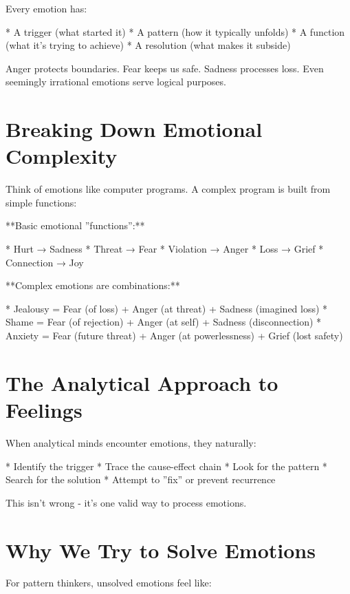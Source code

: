 \documentclass[12pt,oneside]{book}
\begin{document}
Every emotion has:

                    * A trigger (what started it)
                    * A pattern (how it typically unfolds)
                    * A function (what it's trying to achieve)
                    * A resolution (what makes it subside)

Anger protects boundaries. Fear keeps us safe. Sadness processes loss. Even seemingly irrational emotions serve logical purposes.

\section{Breaking Down Emotional Complexity}

Think of emotions like computer programs. A complex program is built from simple functions:

**Basic emotional ''functions'':**

                    * Hurt → Sadness
                    * Threat → Fear
                    * Violation → Anger
                    * Loss → Grief
                    * Connection → Joy

**Complex emotions are combinations:**

                    * Jealousy = Fear (of loss) + Anger (at threat) + Sadness (imagined loss)
                    * Shame = Fear (of rejection) + Anger (at self) + Sadness (disconnection)
                    * Anxiety = Fear (future threat) + Anger (at powerlessness) + Grief (lost safety)

\section{The Analytical Approach to Feelings}

When analytical minds encounter emotions, they naturally:

                    * Identify the trigger
                    * Trace the cause-effect chain
                    * Look for the pattern
                    * Search for the solution
                    * Attempt to ''fix'' or prevent recurrence

This isn't wrong - it's one valid way to process emotions.

\section{Why We Try to Solve Emotions}

For pattern thinkers, unsolved emotions feel like:
\end{document}
